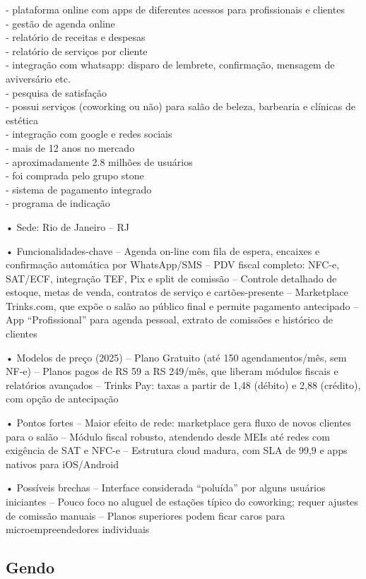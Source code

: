 - plataforma online com apps de diferentes acessos para profissionais e clientes\\
- gestão de agenda online\\
- relatório de receitas e despesas\\
- relatório de serviços por cliente\\
- integração com whatsapp: disparo de lembrete, confirmação, mensagem de aviversário etc.\\
- pesquisa de satisfação \\
- possui serviços  (coworking ou não) para salão de beleza, barbearia e clínicas de estética \\
- integração com google e redes sociais\\
- mais de 12 anos no mercado \\
- aproximadamente 2.8 milhões de usuários\\
- foi comprada pelo grupo stone\\
- sistema de pagamento integrado\\
- programa de indicação

• Sede: Rio de Janeiro – RJ

• Funcionalidades-chave
– Agenda on-line com fila de espera, encaixes e confirmação automática por WhatsApp/SMS
– PDV fiscal completo: NFC-e, SAT/ECF, integração TEF, Pix e split de comissão
– Controle detalhado de estoque, metas de venda, contratos de serviço e cartões-presente
– Marketplace Trinks.com, que expõe o salão ao público final e permite pagamento antecipado
– App “Profissional” para agenda pessoal, extrato de comissões e histórico de clientes

• Modelos de preço (2025)
– Plano Gratuito (até 150 agendamentos/mês, sem NF-e)
– Planos pagos de RS 59 a RS 249/mês, que liberam módulos fiscais e relatórios avançados
– Trinks Pay: taxas a partir de 1,48  (débito) e 2,88  (crédito), com opção de antecipação

• Pontos fortes
– Maior efeito de rede: marketplace gera fluxo de novos clientes para o salão
– Módulo fiscal robusto, atendendo desde MEIs até redes com exigência de SAT e NFC-e
– Estrutura cloud madura, com SLA de 99,9  e apps nativos para iOS/Android

• Possíveis brechas
– Interface considerada “poluída” por alguns usuários iniciantes
– Pouco foco no aluguel de estações típico do coworking; requer ajustes de comissão manuais
– Planos superiores podem ficar caros para microempreendedores individuais


\subsection{Gendo}


